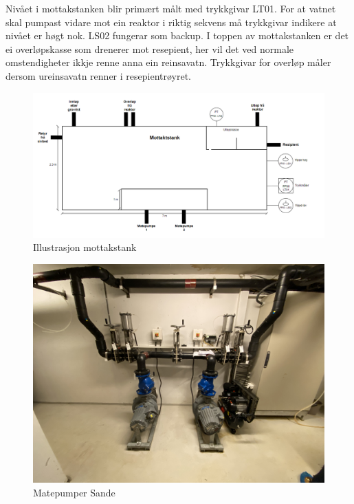Nivået i mottakstanken blir primært målt med trykkgivar LT01. For at vatnet skal pumpast vidare mot ein
reaktor i riktig sekvens må trykkgivar indikere at nivået er høgt nok. LS02 fungerar som backup.
I toppen av mottakstanken er det ei overløpskasse som drenerer mot resepient, her vil det
ved normale omstendigheter ikkje renne anna ein reinsavatn. Trykkgivar for overløp måler
dersom ureinsavatn renner i resepientrøyret.


\begin{figure}[htbp]
    \centering
    \includegraphics[width=1\textwidth]{Figurar/Mottakstank.png}
    \caption{Illustrasjon mottakstank}\label{fig:HMI}
\end{figure}

\begin{figure}[htbp]
    \centering
    \includegraphics[width=1\textwidth]{Bilder/Bilde pumper.jpg}
    \caption{Matepumper Sande}\label{fig:HMI}
\end{figure}


